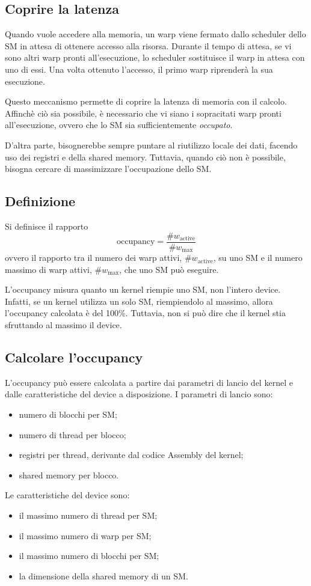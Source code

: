 \subsection{Coprire la latenza}
Quando vuole accedere alla memoria, un warp viene fermato dallo scheduler dello SM in attesa di ottenere accesso alla risorsa.
Durante il tempo di attesa, se vi sono altri warp pronti all'esecuzione, lo scheduler sostituisce il warp in attesa con uno di essi.
Una volta ottenuto l'accesso, il primo warp riprenderà la sua esecuzione.

Questo meccanismo permette di coprire la latenza di memoria con il calcolo.
Affinchè ciò sia possibile, è necessario che vi siano i sopracitati warp pronti all'esecuzione, ovvero che lo SM sia sufficientemente \emph{occupato}.

D'altra parte, bisognerebbe sempre puntare al riutilizzo locale dei dati, facendo uso dei registri e della shared memory.
Tuttavia, quando ciò non è possibile, bisogna cercare di massimizzare l'occupazione dello SM.

\subsection{Definizione}
Si definisce  il rapporto
\[\text{occupancy}=\frac{\#w_{\text{active}}}{\#w_{\max}}\]
ovvero il rapporto tra il numero dei warp attivi, \(\#w_{\text{active}}\), su uno SM e il numero massimo di warp attivi, \(\#w_{\max}\), che uno SM può eseguire.

\begin{note}{}
    L'occupancy misura quanto un kernel riempie uno SM, non l'intero device. Infatti, se un kernel utilizza un solo SM, riempiendolo al massimo, allora l'occupancy calcolata è del 100\%. Tuttavia, non si può dire che il kernel stia sfruttando al massimo il device.
\end{note}

\subsection{Calcolare l'occupancy}
L'occupancy può essere calcolata a partire dai parametri di lancio del kernel e dalle caratteristiche del device a disposizione. I parametri di lancio sono:
\begin{itemize}
    \item numero di blocchi per SM;
    \item numero di thread per blocco;
    \item registri per thread, derivante dal codice Assembly del kernel;
    \item shared memory per blocco.
\end{itemize}
Le caratteristiche del device sono:
\begin{itemize}
    \item il massimo numero di thread per SM;
    \item il massimo numero di warp per SM;
    \item il massimo numero di blocchi per SM;
    \item la dimensione della shared memory di un SM.
\end{itemize}

